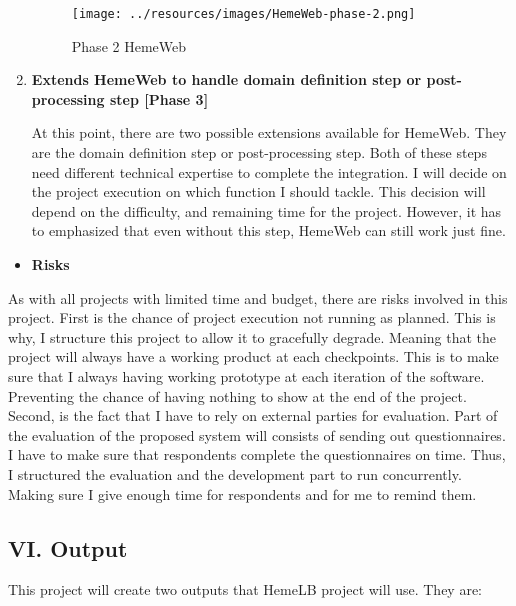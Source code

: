 \documentclass[]{article}
\providecommand{\tightlist}{%
  \setlength{\itemsep}{0pt}\setlength{\parskip}{0pt}}
\begin{document}
\begin{enumerate}
  \begin{figure}[H]
  \centering
  \texttt{[image: ../resources/images/HemeWeb-phase-2.png]}
  \caption{Phase 2 HemeWeb}
  \end{figure}
\item
  \textbf{Extends HemeWeb to handle domain definition step or
  post-processing step {[}Phase 3{]}}

  At this point, there are two possible extensions available for
  HemeWeb. They are the domain definition step or post-processing step.
  Both of these steps need different technical expertise to complete the
  integration. I will decide on the project execution on which function
  I should tackle. This decision will depend on the difficulty, and
  remaining time for the project. However, it has to emphasized that
  even without this step, HemeWeb can still work just fine.
\end{enumerate}

\begin{itemize}
\tightlist
\item
  \textbf{Risks}
\end{itemize}

As with all projects with limited time and budget, there are risks
involved in this project. First is the chance of project execution not
running as planned. This is why, I structure this project to allow it to
gracefully degrade. Meaning that the project will always have a working
product at each checkpoints. This is to make sure that I always having
working prototype at each iteration of the software. Preventing the
chance of having nothing to show at the end of the project. Second, is
the fact that I have to rely on external parties for evaluation. Part of
the evaluation of the proposed system will consists of sending out
questionnaires. I have to make sure that respondents complete the
questionnaires on time. Thus, I structured the evaluation and the
development part to run concurrently. Making sure I give enough time for
respondents and for me to remind them.

\subsection{VI. Output}\label{vi.-output}

This project will create two outputs that HemeLB project will use. They
are:
\end{document}
